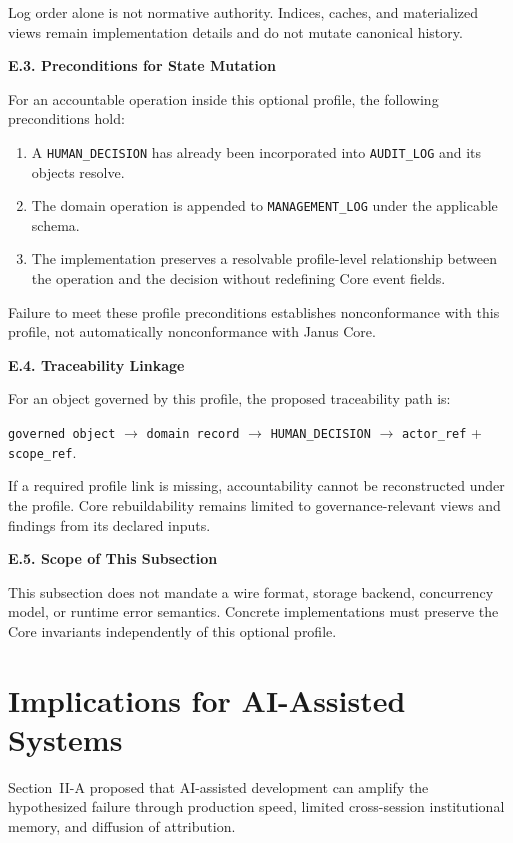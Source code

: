 \documentclass[conference]{IEEEtran}
\begin{document}
Log order alone is not normative authority. Indices, caches, and materialized
views remain implementation details and do not mutate canonical history.

\noindent\textbf{E.3. Preconditions for State Mutation}

For an accountable operation inside this optional profile, the following
preconditions hold:

\begin{enumerate}
  \item A \texttt{HUMAN\_DECISION} has already been incorporated into
  \texttt{AUDIT\_LOG} and its objects resolve.
  \item The domain operation is appended to \texttt{MANAGEMENT\_LOG} under the
  applicable schema.
  \item The implementation preserves a resolvable profile-level relationship
  between the operation and the decision without redefining Core event fields.
\end{enumerate}

Failure to meet these profile preconditions establishes nonconformance with this
profile, not automatically nonconformance with Janus Core.

\noindent\textbf{E.4. Traceability Linkage}

For an object governed by this profile, the proposed traceability path is:

\medskip
\noindent\texttt{governed object} $\rightarrow$ \texttt{domain record}
$\rightarrow$ \texttt{HUMAN\_DECISION} $\rightarrow$
\texttt{actor\_ref} + \texttt{scope\_ref}.

\medskip
If a required profile link is missing, accountability cannot be reconstructed
under the profile. Core rebuildability remains limited to governance-relevant
views and findings from its declared inputs.

\noindent\textbf{E.5. Scope of This Subsection}

This subsection does not mandate a wire format, storage backend, concurrency
model, or runtime error semantics. Concrete implementations must preserve the
Core invariants independently of this optional profile.

\section{Implications for AI-Assisted Systems}

Section~II-A proposed that AI-assisted development can amplify the hypothesized
failure through production speed, limited cross-session institutional memory,
and diffusion of attribution.
\end{document}

